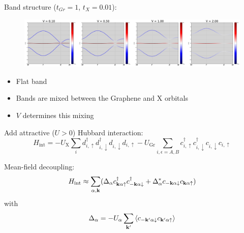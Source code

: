 \documentclass[aspectratio=169]{beamer}
\begin{document}
\begin{frame}
	Band structure (\(t_{Gr} = 1\), \(t_{X} = 0.01\)):
	
	\begin{figure}
		\includegraphics[width=\textwidth]{figs/EG_X bands_tGr_1_tX_0.01}
	\end{figure}
	
	\begin{itemize}
		\item Flat band
		\item Bands are mixed between the Graphene and X orbitals
		\item \(V\) determines this mixing
	\end{itemize}
\end{frame}


\begin{frame}
	Add attractive (\(U > 0\)) Hubbard interaction:
	\begin{equation}
		H_{\mathrm{int}} = -U_{\mathrm{X}} \sum_{i} d_{i, \uparrow}^{\dagger} d_{i, \downarrow}^{\dagger} d_{i, \downarrow} d_{i, \uparrow}
		- U_{\mathrm{Gr}} \sum_{i, \epsilon=A, B} c_{i, \uparrow}^{\dagger} c_{i, \downarrow}^{\dagger} c_{i, \downarrow} c_{i, \uparrow}
	\end{equation}

	Mean-field decoupling:
	\begin{align}
		H_{\mathrm{int}} \approx \sum_{\alpha, \mathbf{k}} (\Delta_{\alpha} c_{\mathbf{k} \alpha \uparrow}^{\dagger} c_{-\mathbf{k} \alpha \downarrow}^{\dagger} + \Delta_{\alpha}^* c_{-\mathbf{k} \alpha \downarrow} c_{\mathbf{k} \alpha \uparrow})
	\end{align}
	with
	\begin{equation}
		\Delta_{\alpha} = - U_{\alpha} \sum_{\mathbf{k}^{\prime}} \braket{c_{-\mathbf{k}^{\prime} \alpha \downarrow} c_{\mathbf{k}^{\prime} \alpha \uparrow}}
	\end{equation}
\end{frame}
\end{document}
